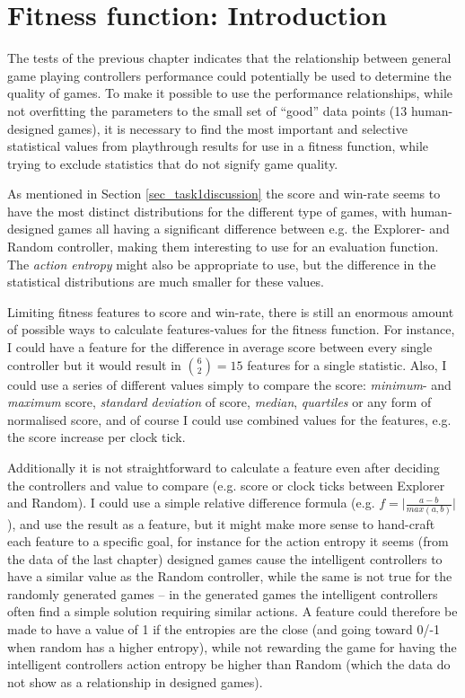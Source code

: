 \documentclass[a4paper,titlepage,final]{report}
\begin{document}
\section{Fitness function: Introduction}
\label{sec_task2intro}
The tests of the previous chapter indicates that the relationship between general game playing controllers performance could potentially be used to determine the quality of games. 
To make it possible to use the performance relationships, while not overfitting the parameters to the small set of ``good'' data points (13 human-designed games), it is necessary to find the most important and selective statistical values from playthrough results for use in a fitness function, while trying to exclude statistics that do not signify game quality.

As mentioned in Section \ref{sec_task1discussion} the score and win-rate seems to have the most distinct distributions for the different type of games, with human-designed games all having a significant difference between e.g. the Explorer- and Random controller, making them interesting to use for an evaluation function.
The \textit{action entropy} might also be appropriate to use, but the difference in the statistical distributions are much smaller for these values.

Limiting fitness features to score and win-rate, there is still an enormous amount of possible ways to calculate features-values for the fitness function.
For instance, I could have a feature for the difference in average score between every single controller but it would result in $\binom{6}{2}=15$ features for a single statistic.
Also, I could use a series of different values simply to compare the score: \textit{minimum}- and \textit{maximum} score, \textit{standard deviation} of score, \textit{median}, \textit{quartiles} or any form of normalised score, and of course I could  use combined values for the features, e.g. the score increase per clock tick.

Additionally it is not straightforward to calculate a feature even after deciding the controllers and value to compare (e.g. score or clock ticks between Explorer and Random).
I could use a simple relative difference formula (e.g. $f=\lvert\frac{a-b}{max(a,b)}\rvert$), and use the result as a feature, but it might make more sense to hand-craft each feature to a specific goal, for instance for the action entropy it seems (from the data of the last chapter) designed games cause the intelligent controllers to have a similar value as the Random controller, while the same is not true for the randomly generated games -- in the generated games the intelligent controllers often find a simple solution requiring similar actions.
A feature could therefore be made to have a value of 1 if the entropies are the close (and going toward 0/-1 when random has a higher entropy), while not rewarding the game for having the intelligent controllers action entropy be higher than Random (which the data do not show as a relationship in designed games).
\end{document}
